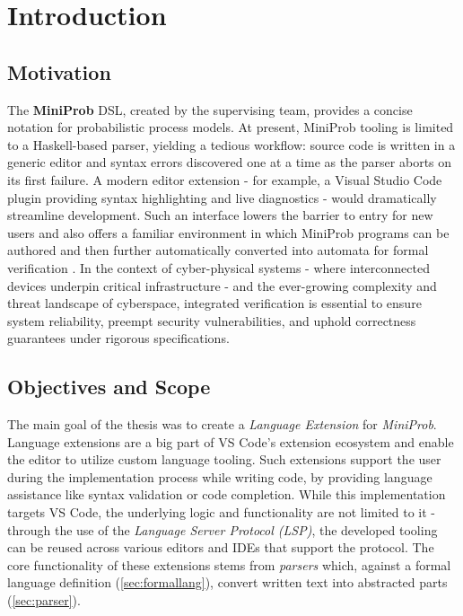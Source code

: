 \chapter{Introduction}
\section{Motivation}

The \textbf{MiniProb} DSL, created by the supervising team, provides a concise notation for probabilistic process models\cite{guideMiniProb}. At present,
MiniProb tooling is limited to a Haskell-based parser, yielding a tedious workflow: source code is written
in a generic editor and syntax errors discovered one at a time as the parser aborts on its first failure. A modern editor extension - for example, a
Visual Studio Code plugin providing syntax highlighting and live diagnostics - would dramatically streamline development. Such an interface lowers the barrier to entry for
new users and also offers a familiar environment in which MiniProb programs can be authored and then further automatically converted into automata for formal verification \cite{2025modelcheckingprobabilisticoperator,POPACheck}.
In the context of cyber-physical systems - where interconnected devices underpin critical infrastructure - and the ever-growing complexity and threat landscape of cyberspace,
integrated verification is essential to ensure system reliability, preempt security vulnerabilities, and uphold correctness guarantees under rigorous specifications.

\label{sec:scope}
\section{Objectives and Scope}
The main goal of the thesis was to create a \textit{Language Extension} for \textit{MiniProb}. Language extensions are a big part of
VS Code's extension ecosystem and enable the editor to utilize custom language tooling. Such extensions support the user during the implementation process
while writing code, by providing language assistance like syntax validation or code completion. While this implementation targets VS Code, the underlying
logic and functionality are not limited to it - through the use of the \textit{Language Server Protocol (LSP)}, the developed tooling can be reused across
various editors and IDEs that support the protocol. The core functionality of these extensions stems from \textit{parsers} which, against a formal language
definition (\ref{sec:formallang}), convert written text into abstracted parts (\ref{sec:parser}).

